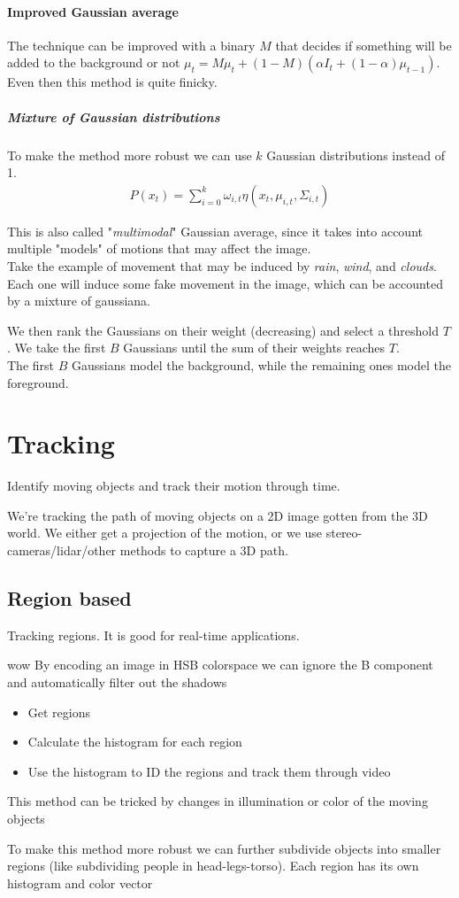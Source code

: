 \documentclass{article}
\begin{document}
\paragraph{Improved Gaussian average} The technique can be improved with a binary $M$ that decides if something will be added to the background or not $\mu_t = M\mu_t + (1-M)(\alpha I_t + (1-\alpha)\mu_{t-1})$. Even then this method is quite finicky.

\subparagraph{Mixture of Gaussian distributions}
To make the method more robust we can use $k$ Gaussian distributions instead of 1.
\begin{align*}
    P(x_t) = \sum_{i=0}^k \omega_{i,t}\eta(x_t,\mu_{i,t},\Sigma_{i,t})
\end{align*}

This is also called "\textit{multimodal}" Gaussian average, since it takes into account multiple "models" of motions that may affect the image.\\
Take the example of movement that may be induced by \textit{rain}, \textit{wind}, and \textit{clouds}. Each one will induce some fake movement in the image, which can be accounted by a mixture of gaussiana.

We then rank the Gaussians on their weight (decreasing) and select a threshold $T$. We take the first $B$ Gaussians until the sum of their weights reaches $T$.\\
The first $B$ Gaussians model the background, while the remaining ones model the foreground.

\section{Tracking}
Identify moving objects and track their motion through time.

We're tracking the path of moving objects on a 2D image gotten from the 3D world. We either get a projection of the motion, or we use stereo-cameras/lidar/other methods to capture a 3D path.

\subsection{Region based}
Tracking regions. It is good for real-time applications.

\begin{callout}{wow}
    By encoding an image in HSB colorspace we can ignore the B component and automatically filter out the shadows
\end{callout}

\begin{itemize}
    \item Get regions
    \item Calculate the histogram for each region
    \item Use the histogram to ID the regions and track them through video
\end{itemize}
This method can be tricked by changes in illumination or color of the moving objects

To make this method more robust we can further subdivide objects into smaller regions (like subdividing people in head-legs-torso). Each region has its own histogram and color vector
\end{document}
